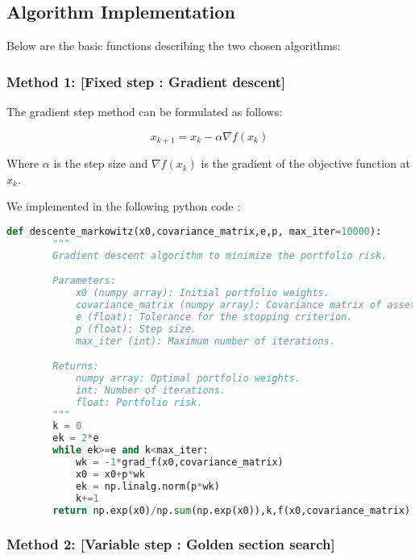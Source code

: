 \documentclass[12pt]{article}
\begin{document}
\subsection*{Algorithm Implementation}

Below are the basic functions describing the two chosen algorithms:

\subsubsection*{Method 1: [Fixed step : Gradient descent]}


The gradient step method can be formulated as follows:

\begin{equation}
    x_{k+1} = x_k - \alpha \nabla f(x_k)
\end{equation}
    
Where $\alpha$ is the step size and $\nabla f(x_k)$ is the gradient of the objective function at $x_k$.

We implemented in the following python code :


\begin{lstlisting}[language=Python]
    def descente_markowitz(x0,covariance_matrix,e,p, max_iter=10000):
        """ 
        Gradient descent algorithm to minimize the portfolio risk.

        Parameters:
            x0 (numpy array): Initial portfolio weights.
            covariance_matrix (numpy array): Covariance matrix of asset returns.
            e (float): Tolerance for the stopping criterion.
            p (float): Step size.
            max_iter (int): Maximum number of iterations.

        Returns:
            numpy array: Optimal portfolio weights.
            int: Number of iterations.
            float: Portfolio risk.
        """
        k = 0
        ek = 2*e
        while ek>=e and k<max_iter:
            wk = -1*grad_f(x0,covariance_matrix)
            x0 = x0+p*wk
            ek = np.linalg.norm(p*wk)
            k+=1
        return np.exp(x0)/np.sum(np.exp(x0)),k,f(x0,covariance_matrix)
\end{lstlisting}



\subsubsection*{Method 2: [Variable step : Golden section search]}
\end{document}
